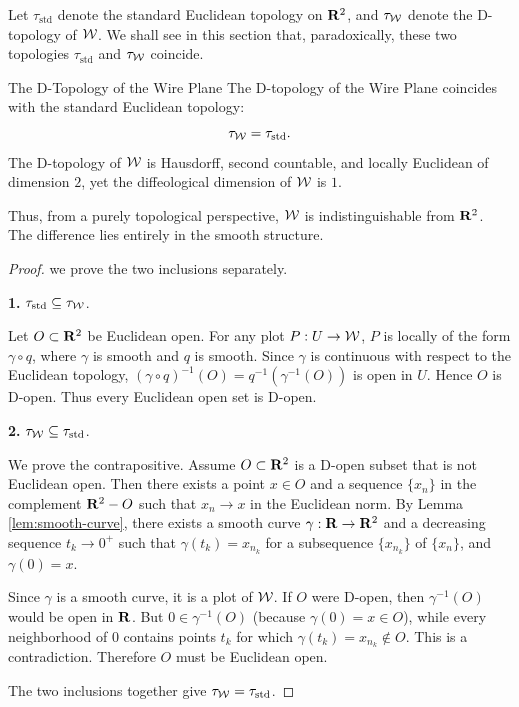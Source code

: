 Let $\tau_{\text{std}}$ denote the standard Euclidean topology on $\mathbf{R}^2$,
and $\tau_{\mathcal{W}}$ denote the D-topology of $\mathcal{W}$.
We shall see in this section that,
paradoxically,
these two topologies $\tau_{\text{std}}$ and $\tau_{\mathcal{W}}$ coincide.

\begin{Article}{The D-Topology of the Wire Plane}
  \label{prop:topology-identity}
  The D-topology of the Wire Plane coincides with the standard Euclidean topology:
  $$%
    \tau_{\cW} = \tau_{\text{std}}.
    $$%
  The D-topology of $\mathcal{W}$ is Hausdorff,
  second countable,
  and locally Euclidean of dimension $2$,
  yet the diffeological dimension of $\mathcal{W}$ is $1$.
  
  Thus,
  from a purely topological perspective,
  $\mathcal{W}$ is indistinguishable from $\mathbf{R}^2$.
  The difference lies entirely in the smooth structure.
\end{Article}

\begin{proof}
  we prove the two inclusions separately.
  
  \textbf{1.} $\tau_{\text{std}} \subseteq \tau_{\mathcal{W}}$.
  
  Let $O \subset \mathbf{R}^2$ be Euclidean open.
  For any plot $P: U \to \mathcal{W}$,
  $P$ is locally of the form $\gamma \circ q$,
  where $\gamma$ is smooth and $q$ is smooth.
  Since $\gamma$ is continuous with respect to the Euclidean topology,
  $(\gamma \circ q)^{-1}(O) = q^{-1}(\gamma^{-1}(O))$ is open in $U$.
  Hence $O$ is D-open.
  Thus every Euclidean open set is D-open.
  
  \textbf{2.} $\tau_{\mathcal{W}} \subseteq \tau_{\text{std}}$.
  
  We prove the contrapositive.
  Assume $O \subset \mathbf{R}^2$ is a D-open subset that is not Euclidean open.
  Then there exists a point $x \in O$ and a sequence $\{x_n\}$ in the complement $\mathbf{R}^2 - O$ such that $x_n \to x$ in the Euclidean norm.
  By Lemma \ref{lem:smooth-curve}, there exists a smooth curve $\gamma: \mathbf{R} \to \mathbf{R}^2$ and a decreasing sequence $t_k \to 0^+$ such that $\gamma(t_k) = x_{n_k}$ for a subsequence $\{x_{n_k}\}$ of $\{x_n\}$, and $\gamma(0)=x$.
  
  Since $\gamma$ is a smooth curve,
  it is a plot of $\mathcal{W}$.
  If $O$ were D-open,
  then $\gamma^{-1}(O)$ would be open in $\mathbf{R}$.
  But $0 \in \gamma^{-1}(O)$ (because $\gamma(0)=x \in O$),
  while every neighborhood of $0$ contains points $t_k$ for which $\gamma(t_k)=x_{n_k} \notin O$.
  This is a contradiction.
  Therefore $O$ must be Euclidean open.
  
  The two inclusions together give $\tau_{\mathcal{W}} = \tau_{\text{std}}$.
\end{proof}

